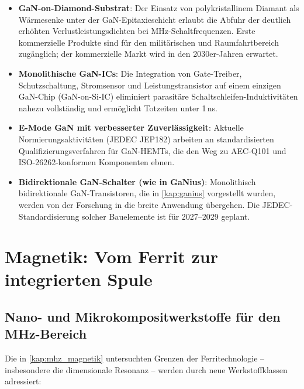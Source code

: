 ﻿\documentclass[a4paper,12pt,openany,oneside]{book}
\newcommand{\abschnitt}[1]{\section{#1}}
\newcommand{\unterabschnitt}[1]{\subsection{#1}}
\theoremstyle{definition}
\begin{document}
\begin{itemize}
  \item \textbf{GaN-on-Diamond-Substrat}: Der Einsatz von polykristallinem Diamant als
    W\"armesenke unter der GaN-Epitaxieschicht erlaubt die Abfuhr der deutlich erh\"ohten
    Verlustleistungsdichten bei MHz-Schaltfrequenzen. Erste kommerzielle Produkte sind
    f\"ur den milit\"arischen und Raumfahrtbereich zug\"anglich; der kommerzielle Markt
    wird in den 2030er-Jahren erwartet.
  \item \textbf{Monolithische GaN-ICs}: Die Integration von Gate-Treiber, Schutzschaltung,
    Stromsensor und Leistungstransistor auf einem einzigen GaN-Chip (GaN-on-Si-IC)
    eliminiert parasit\"are Schaltschleifen-Induktivit\"aten nahezu vollst\"andig und
    erm\"oglicht Totzeiten unter 1\,ns.
  \item \textbf{E-Mode GaN mit verbesserter Zuverl\"assigkeit}: Aktuelle Normierungsaktivit\"aten
    (JEDEC JEP182) arbeiten an standardisierten Qualifizierungsverfahren f\"ur GaN-HEMTs,
    die den Weg zu AEC-Q101 und ISO-26262-konformen Komponenten ebnen.
  \item \textbf{Bidirektionale GaN-Schalter (wie in GaNius)}: Monolithisch bidirektionale
    GaN-Transistoren, die in \autoref{kap:ganius} vorgestellt wurden, werden von der
    Forschung in die breite Anwendung \"ubergehen. Die JEDEC-Standardisierung solcher
    Bauelemente ist f\"ur 2027--2029 geplant.
\end{itemize}

\abschnitt{Magnetik: Vom Ferrit zur integrierten Spule}

\unterabschnitt{Nano- und Mikrokompositwerkstoffe f\"ur den MHz-Bereich}

Die in \autoref{kap:mhz_magnetik} untersuchten Grenzen der Ferritechnologie --
insbesondere die dimensionale Resonanz -- werden durch neue Werkstoffklassen adressiert:
\end{document}
